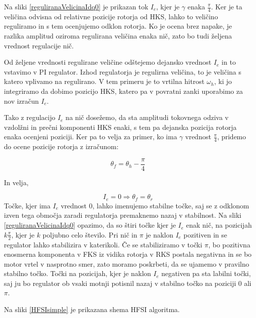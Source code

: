 \documentclass[a4paper,twoside,openright,12pt,slovene]{book}
\begin{document}
Na sliki \ref{reguliranaVelicinaIdq0} je prikazan tok $I_e$, kjer je $\gamma$ enaka $\frac{\pi}{4}$. Ker je ta veličina odvisna od relativne pozicije rotorja od HKS, lahko to veličino reguliramo in s
tem ocenjujemo odklon rotorja. Ko je ocena brez napake, je razlika amplitud oziroma regulirana veličina enaka nič, zato bo tudi željena vrednost regulacije nič. 

Od željene vrednosti regulirane veličine odštejemo dejansko vrednost $I_e$ in to vstavimo v PI regulator. Izhod regulatorja je regulirna veličina, to je veličina s katero vplivamo na regulirano. 
V tem primeru je to vrtilna hitrost $\omega_h$, ki jo integriramo da dobimo pozicijo HKS, katero pa v povratni zanki uporabimo za nov izračun $I_e$. 

Tako z regulacijo $I_e$ na nič dosežemo, da sta amplitudi tokovnega odziva v vzdolžni in prečni komponenti HKS enaki, s tem pa dejanska pozicija rotorja enaka ocenjeni poziciji. 
Ker pa to velja za primer, ko ima $\gamma$ vrednost $\frac{\pi}{4}$, pridemo do ocene pozicije rotorja z izračunom:

\begin{equation}
    \theta_{f} = \theta_{h} - \frac{\pi}{4}
\end{equation}

In velja,

\begin{equation}
    I_e = 0 \Rightarrow \theta_{f} = \theta_{r}
\end{equation}
Točke, kjer ima $I_e$ vrednost 0, lahko imenujemo stabilne točke, saj se z odklonom izven tega območja zaradi regulatorja premaknemo nazaj v stabilnost. Na sliki \ref{reguliranaVelicinaIdq0} opazimo,
da so štiri točke kjer je $I_e$ enak nič, na pozicijah $k\frac{\pi}{2}$, kjer je $k$ poljubno celo število. Pri nič in $\pi$ je naklon $I_e$ pozitiven in se regulator lahko stabilizira v katerikoli. 
Če se stabiliziramo v točki $\pi$, bo pozitivna enosmerna komponenta v FKS iz vidika rotorja v RKS postala negativna in se bo motor vrtel v nasprotno smer, zato moramo poskrbeti, da se ujamemo 
v pravilno stabilno točko. Točki na pozicijah, kjer je naklon $I_e$ negativen pa sta labilni točki, saj ju bo regulator ob vsaki motnji potisnil nazaj v stabilno točko na poziciji 0 ali $\pi$.

Na sliki \ref{HFSIsimple} je prikazana shema HFSI algoritma.
\end{document}
